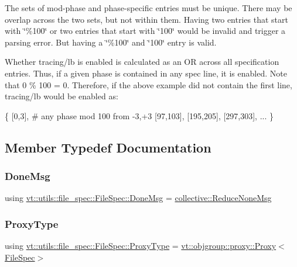 The sets of mod-\/phase and phase-\/specific entries must be unique. There may be overlap across the two sets, but not within them. Having two entries that start with \char`\"{}\%100\char`\"{} or two entries that start with \char`\"{}100\char`\"{} would be invalid and trigger a parsing error. But having a \char`\"{}\%100\char`\"{} and \char`\"{}100\char`\"{} entry is valid.

Whether tracing/lb is enabled is calculated as an OR across all specification entries. Thus, if a given phase is contained in any spec line, it is enabled. Note that 0 \% 100 = 0. Therefore, if the above example did not contain the first line, tracing/lb would be enabled as\+:

\{ \mbox{[}0,3\mbox{]}, \# any phase mod 100 from -\/3,+3 \mbox{[}97,103\mbox{]}, \mbox{[}195,205\mbox{]}, \mbox{[}297,303\mbox{]}, ... \} 

\subsection{Member Typedef Documentation}
\mbox{\label{structvt_1_1utils_1_1file__spec_1_1_file_spec_ac8062352203598c411265a478ec1b0c7}} 
\subsubsection{\texorpdfstring{Done\+Msg}{DoneMsg}}
{\footnotesize\ttfamily using \hyperlink{structvt_1_1utils_1_1file__spec_1_1_file_spec_ac8062352203598c411265a478ec1b0c7}{vt\+::utils\+::file\+\_\+spec\+::\+File\+Spec\+::\+Done\+Msg} =  \hyperlink{namespacevt_1_1collective_aa439a90f05078f2bcf918641c951946f}{collective\+::\+Reduce\+None\+Msg}}

\mbox{\label{structvt_1_1utils_1_1file__spec_1_1_file_spec_ac4ad61ed146069ab671ec1bf909ebded}} 
\subsubsection{\texorpdfstring{Proxy\+Type}{ProxyType}}
{\footnotesize\ttfamily using \hyperlink{structvt_1_1utils_1_1file__spec_1_1_file_spec_ac4ad61ed146069ab671ec1bf909ebded}{vt\+::utils\+::file\+\_\+spec\+::\+File\+Spec\+::\+Proxy\+Type} =  \hyperlink{structvt_1_1objgroup_1_1proxy_1_1_proxy}{vt\+::objgroup\+::proxy\+::\+Proxy}$<$\hyperlink{structvt_1_1utils_1_1file__spec_1_1_file_spec}{File\+Spec}$>$}

